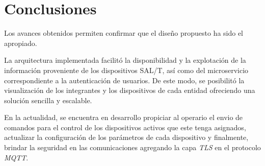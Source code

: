 
\section{Conclusiones}

Los avances obtenidos permiten confirmar que el diseño propuesto ha sido el apropiado. 

La arquitectura implementada facilitó la disponibilidad y la explotación de la información proveniente de los dispositivos SAL/T, así como del microservicio correspondiente a la autenticación de usuarios.
De este modo, se posibilitó la visualización de los integrantes y los dispositivos de cada entidad ofreciendo una solución sencilla y escalable. 

En la actualidad, se encuentra en desarrollo propiciar al operario el envio de comandos para el control de los dispositivos activos que este tenga asignados, actualizar la configuración de los parámetros de cada dispositivo
y finalmente, brindar la seguridad en las comunicaciones agregando la capa \textit{TLS} en el protocolo \textit{MQTT}.
